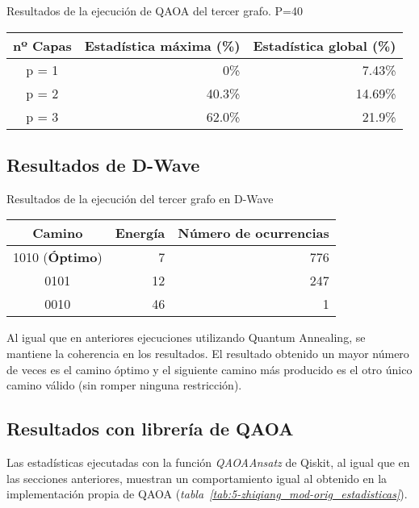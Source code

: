 \begin{table}[htbp]{}{Resultados de la ejecución de QAOA del tercer grafo. P=40}
  \centering
  \begin{tabular}{|c|r|r|}
    \hline
    \textbf{nº Capas} & \textbf{Estadística máxima (\%)} & \textbf{Estadística global (\%)} \\ \hline
    p = 1 &    0\% &  7.43\% \\ \hline
    p = 2 & 40.3\% & 14.69\% \\ \hline
    p = 3 & 62.0\% &  21.9\% \\ \hline
  \end{tabular}
\end{table}

\subsection{Resultados de D-Wave}
\begin{table}[htbp]{}{Resultados de la ejecución del tercer grafo en D-Wave}
  \centering
  \begin{tabular}{|c|r|r|}
    \hline
    \textbf{Camino} & \textbf{Energía} & \textbf{Número de ocurrencias} \\ \hline
    1010 (\textbf{Óptimo}) &  7 & 776 \\ \hline
    0101                   & 12 & 247 \\ \hline
    0010                   & 46 &   1 \\ \hline
  \end{tabular}
\end{table}

Al igual que en anteriores ejecuciones utilizando Quantum Annealing, se mantiene la coherencia en los resultados. El resultado obtenido un mayor número de veces es el camino óptimo y el siguiente camino más producido es el otro único camino válido (sin romper ninguna restricción).

\subsection{Resultados con librería de QAOA}

Las estadísticas ejecutadas con la función \textit{QAOAAnsatz} de Qiskit, al igual que en las secciones anteriores, muestran un comportamiento igual al obtenido en la implementación propia de QAOA (\textit{tabla~\ref{tab:5-zhiqiang_mod-orig_estadisticas}}).

